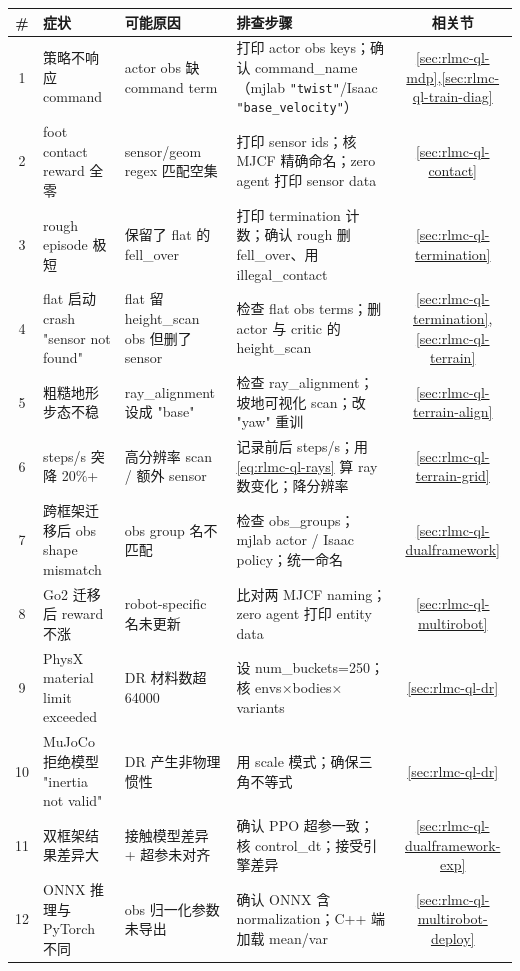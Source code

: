 \begin{center}
\small
\begin{tabular}{@{}cp{3.2cm}p{3.4cm}p{4.2cm}c@{}}
\toprule
\# & 症状 & 可能原因 & 排查步骤 & 相关节 \\
\midrule
1 & 策略不响应 command & actor obs 缺 command term & 打印 actor obs keys；确认 command\_name（mjlab \verb|"twist"|/Isaac \verb|"base_velocity"|） & \cref{sec:rlmc-ql-mdp},\cref{sec:rlmc-ql-train-diag} \\
2 & foot contact reward 全零 & sensor/geom regex 匹配空集 & 打印 sensor ids；核 MJCF 精确命名；zero agent 打印 sensor data & \cref{sec:rlmc-ql-contact} \\
3 & rough episode 极短 & 保留了 flat 的 fell\_over & 打印 termination 计数；确认 rough 删 fell\_over、用 illegal\_contact & \cref{sec:rlmc-ql-termination} \\
4 & flat 启动 crash "sensor not found" & flat 留 height\_scan obs 但删了 sensor & 检查 flat obs terms；删 actor 与 critic 的 height\_scan & \cref{sec:rlmc-ql-termination},\cref{sec:rlmc-ql-terrain} \\
5 & 粗糙地形步态不稳 & ray\_alignment 设成 "base" & 检查 ray\_alignment；坡地可视化 scan；改 "yaw" 重训 & \cref{sec:rlmc-ql-terrain-align} \\
6 & steps/s 突降 20\%+ & 高分辨率 scan / 额外 sensor & 记录前后 steps/s；用 \eqref{eq:rlmc-ql-rays} 算 ray 数变化；降分辨率 & \cref{sec:rlmc-ql-terrain-grid} \\
7 & 跨框架迁移后 obs shape mismatch & obs group 名不匹配 & 检查 obs\_groups；mjlab actor / Isaac policy；统一命名 & \cref{sec:rlmc-ql-dualframework} \\
8 & Go2 迁移后 reward 不涨 & robot-specific 名未更新 & 比对两 MJCF naming；zero agent 打印 entity data & \cref{sec:rlmc-ql-multirobot} \\
9 & PhysX material limit exceeded & DR 材料数超 64000 & 设 num\_buckets=250；核 envs$\times$bodies$\times$variants & \cref{sec:rlmc-ql-dr} \\
10 & MuJoCo 拒绝模型 "inertia not valid" & DR 产生非物理惯性 & 用 scale 模式；确保三角不等式 & \cref{sec:rlmc-ql-dr} \\
11 & 双框架结果差异大 & 接触模型差异 + 超参未对齐 & 确认 PPO 超参一致；核 control\_dt；接受引擎差异 & \cref{sec:rlmc-ql-dualframework-exp} \\
12 & ONNX 推理与 PyTorch 不同 & obs 归一化参数未导出 & 确认 ONNX 含 normalization；C++ 端加载 mean/var & \cref{sec:rlmc-ql-multirobot-deploy} \\
\bottomrule
\end{tabular}
\end{center}

